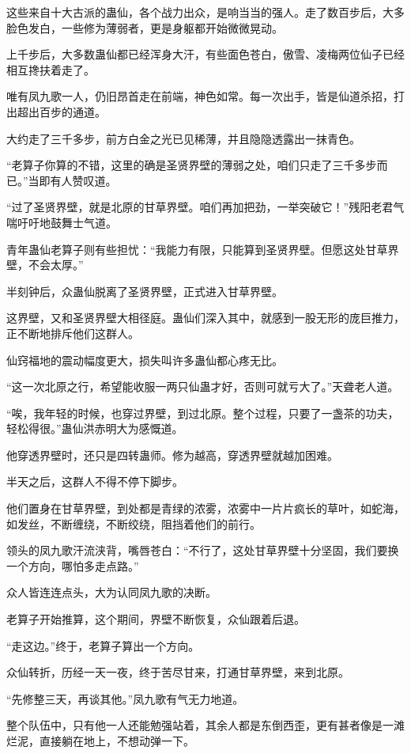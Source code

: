 \begin{this_body}
这些来自十大古派的蛊仙，各个战力出众，是响当当的强人。走了数百步后，大多脸色发白，一些修为薄弱者，更是身躯都开始微微晃动。

上千步后，大多数蛊仙都已经浑身大汗，有些面色苍白，傲雪、凌梅两位仙子已经相互搀扶着走了。

唯有凤九歌一人，仍旧昂首走在前端，神色如常。每一次出手，皆是仙道杀招，打出超出百步的通道。

大约走了三千多步，前方白金之光已见稀薄，并且隐隐透露出一抹青色。

“老算子你算的不错，这里的确是圣贤界壁的薄弱之处，咱们只走了三千多步而已。”当即有人赞叹道。

“过了圣贤界壁，就是北原的甘草界壁。咱们再加把劲，一举突破它！”残阳老君气喘吁吁地鼓舞士气道。

青年蛊仙老算子则有些担忧：“我能力有限，只能算到圣贤界壁。但愿这处甘草界壁，不会太厚。”

半刻钟后，众蛊仙脱离了圣贤界壁，正式进入甘草界壁。

这界壁，又和圣贤界壁大相径庭。蛊仙们深入其中，就感到一股无形的庞巨推力，正不断地排斥他们这群人。

仙窍福地的震动幅度更大，损失叫许多蛊仙都心疼无比。

“这一次北原之行，希望能收服一两只仙蛊才好，否则可就亏大了。”天聋老人道。

“唉，我年轻的时候，也穿过界壁，到过北原。整个过程，只要了一盏茶的功夫，轻松得很。”蛊仙洪赤明大为感慨道。

他穿透界壁时，还只是四转蛊师。修为越高，穿透界壁就越加困难。

半天之后，这群人不得不停下脚步。

他们置身在甘草界壁，到处都是青绿的浓雾，浓雾中一片片疯长的草叶，如蛇海，如发丝，不断缠绕，不断绞绕，阻挡着他们的前行。

领头的凤九歌汗流浃背，嘴唇苍白：“不行了，这处甘草界壁十分坚固，我们要换一个方向，哪怕多走点路。”

众人皆连连点头，大为认同凤九歌的决断。

老算子开始推算，这个期间，界壁不断恢复，众仙跟着后退。

“走这边。”终于，老算子算出一个方向。

众仙转折，历经一天一夜，终于苦尽甘来，打通甘草界壁，来到北原。

“先修整三天，再谈其他。”凤九歌有气无力地道。

整个队伍中，只有他一人还能勉强站着，其余人都是东倒西歪，更有甚者像是一滩烂泥，直接躺在地上，不想动弹一下。

\end{this_body}

